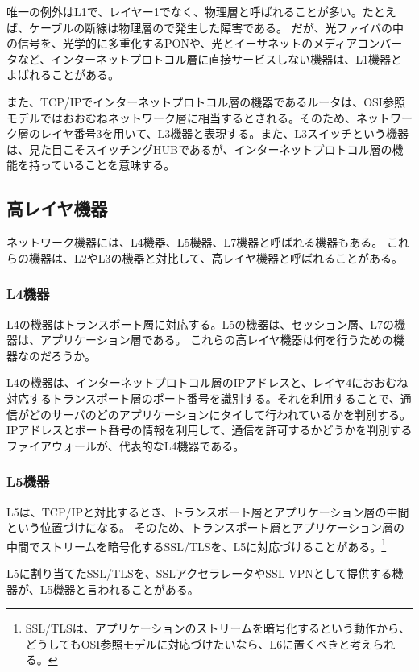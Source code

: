 唯一の例外はL1で、レイヤー1でなく、物理層と呼ばれることが多い。たとえば、ケーブルの断線は物理層ので発生した障害である。
だが、光ファイバの中の信号を、光学的に多重化するPONや、光とイーサネットのメディアコンバータなど、インターネットプロトコル層に直接サービスしない機器は、L1機器とよばれることがある。

また、TCP/IPでインターネットプロトコル層の機器であるルータは、OSI参照モデルではおおむねネットワーク層に相当するとされる。そのため、ネットワーク層のレイヤ番号3を用いて、L3機器と表現する。また、L3スイッチという機器は、見た目こそスイッチングHUBであるが、インターネットプロトコル層の機能を持っていることを意味する。

\subsection{高レイヤ機器}

ネットワーク機器には、L4機器、L5機器、L7機器と呼ばれる機器もある。
これらの機器は、L2やL3の機器と対比して、高レイヤ機器と呼ばれることがある。

\subsubsection{L4機器}

L4の機器はトランスポート層に対応する。L5の機器は、セッション層、L7の機器は、アプリケーション層である。
これらの高レイヤ機器は何を行うための機器なのだろうか。

L4の機器は、インターネットプロトコル層のIPアドレスと、レイヤ4におおむね対応するトランスポート層のポート番号を識別する。それを利用することで、通信がどのサーバのどのアプリケーションにタイして行われているかを判別する。
IPアドレスとポート番号の情報を利用して、通信を許可するかどうかを判別するファイアウォールが、代表的なL4機器である。

\subsubsection{L5機器}

L5は、TCP/IPと対比するとき、トランスポート層とアプリケーション層の中間という位置づけになる。
そのため、トランスポート層とアプリケーション層の中間でストリームを暗号化するSSL/TLSを、L5に対応づけることがある。\footnote{SSL/TLSは、アプリケーションのストリームを暗号化するという動作から、どうしてもOSI参照モデルに対応づけたいなら、L6に置くべきと考えられる。}

L5に割り当てたSSL/TLSを、SSLアクセラレータやSSL-VPNとして提供する機器が、L5機器と言われることがある。

